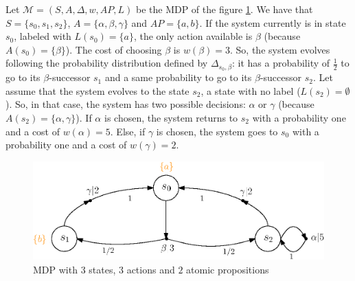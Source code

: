 \begin{example}\label{simple-mdp}
  Let $\mathcal{M} = (S, A, \Delta, w, AP, L)$ be the MDP of the figure \ref{mdp01}. We have that $S = \{s_0, s_1, s_2\}$, $A = \{\alpha, \beta, \gamma\}$ and $AP=\{a, b\}$. If the system currently is in state $s_0$, labeled with $L(s_0) = \{a\}$, the only action available is $\beta$ (because $A(s_0) = \{\beta\}$).
  The cost of choosing $\beta$ is $w(\beta) = 3$.
  So, the system evolves following the probability distribution defined by $\Delta_{s_0, \beta}$: it has a probability of $\frac{1}{2}$
  to go to its $\beta$-successor $s_1$ and a same probability to go to its $\beta$-successor $s_2$. Let assume that the system evolves to the state $s_2$, a state with no label ($L(s_2) = \emptyset$). So, in that case, the system has two possible decisions: $\alpha$ or $\gamma$ (because $A(s_2) = \{\alpha, \gamma\}$). If $\alpha$ is chosen, the system returns to $s_2$ with a probability one and a cost of $w(\alpha) = 5$. Else, if $\gamma$ is chosen, the system goes to $s_0$ with a probability one and a cost of $w(\gamma) = 2$.
  \begin{figure}[h!]
    \centering
    \includegraphics[width=0.7\linewidth]{resources/simple-mdp}
    \caption{MDP with $3$ states, $3$ actions and $2$ atomic propositions}\label{mdp01}
  \end{figure}
\end{example}

